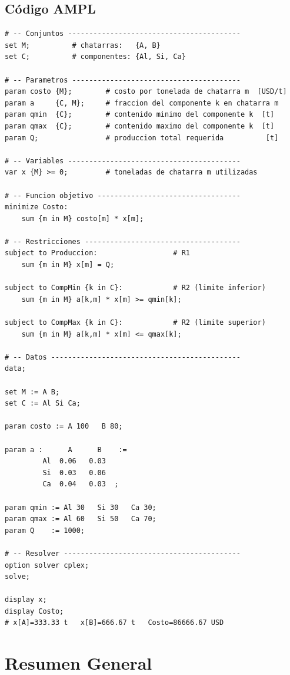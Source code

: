 \documentclass[12pt,a4paper]{article}
\begin{document}
\subsection{Código AMPL}
\begin{lstlisting}[caption={Centro de Reciclaje -- Modelo AMPL}]
# -- Conjuntos -----------------------------------------
set M;          # chatarras:   {A, B}
set C;          # componentes: {Al, Si, Ca}

# -- Parametros ----------------------------------------
param costo {M};        # costo por tonelada de chatarra m  [USD/t]
param a     {C, M};     # fraccion del componente k en chatarra m
param qmin  {C};        # contenido minimo del componente k  [t]
param qmax  {C};        # contenido maximo del componente k  [t]
param Q;                # produccion total requerida          [t]

# -- Variables -----------------------------------------
var x {M} >= 0;         # toneladas de chatarra m utilizadas

# -- Funcion objetivo ----------------------------------
minimize Costo:
    sum {m in M} costo[m] * x[m];

# -- Restricciones -------------------------------------
subject to Produccion:                  # R1
    sum {m in M} x[m] = Q;

subject to CompMin {k in C}:            # R2 (limite inferior)
    sum {m in M} a[k,m] * x[m] >= qmin[k];

subject to CompMax {k in C}:            # R2 (limite superior)
    sum {m in M} a[k,m] * x[m] <= qmax[k];

# -- Datos ---------------------------------------------
data;

set M := A B;
set C := Al Si Ca;

param costo := A 100   B 80;

param a :      A      B    :=
         Al  0.06   0.03
         Si  0.03   0.06
         Ca  0.04   0.03  ;

param qmin := Al 30   Si 30   Ca 30;
param qmax := Al 60   Si 50   Ca 70;
param Q    := 1000;

# -- Resolver ------------------------------------------
option solver cplex;
solve;

display x;
display Costo;
# x[A]=333.33 t   x[B]=666.67 t   Costo=86666.67 USD
\end{lstlisting}

\clearpage
\section*{Resumen General}
\end{document}
